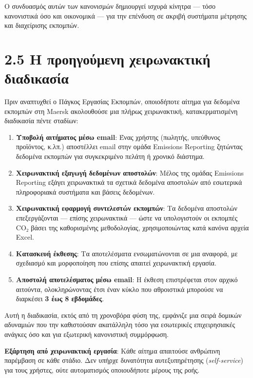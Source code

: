 \documentclass[11pt,a4paper,greek,twoside]{template-xe}
\providecommand{\tightlist}{\setlength{\itemsep}{0pt}\setlength{\parskip}{0pt}}
\begin{document}
Ο συνδυασμός αυτών των κανονισμών δημιουργεί ισχυρά κίνητρα --- τόσο
κανονιστικά όσο και οικονομικά --- για την επένδυση σε ακριβή συστήματα
μέτρησης και διαχείρισης εκπομπών.

\section{2.5 Η προηγούμενη χειρωνακτική
διαδικασία}\label{ux3b7-ux3c0ux3c1ux3bfux3b7ux3b3ux3bfux3cdux3bcux3b5ux3bdux3b7-ux3c7ux3b5ux3b9ux3c1ux3c9ux3bdux3b1ux3baux3c4ux3b9ux3baux3ae-ux3b4ux3b9ux3b1ux3b4ux3b9ux3baux3b1ux3c3ux3afux3b1}

Πριν αναπτυχθεί ο Πάγκος Εργασίας Εκπομπών, οποιοδήποτε αίτημα για
δεδομένα εκπομπών στη Maersk ακολουθούσε μια πλήρως χειρωνακτική,
κατακερματισμένη διαδικασία πέντε σταδίων:

\begin{enumerate}
\def\labelenumi{\arabic{enumi}.}
\tightlist
\item
  \textbf{Υποβολή αιτήματος μέσω email}: Ένας χρήστης (πωλητής,
  υπεύθυνος προϊόντος, κ.λπ.) αποστέλλει email στην ομάδα Emissions
  Reporting ζητώντας δεδομένα εκπομπών για συγκεκριμένο πελάτη ή χρονικό
  διάστημα.
\item
  \textbf{Χειρωνακτική εξαγωγή δεδομένων αποστολών}: Μέλος της ομάδας
  Emissions Reporting εξάγει χειρωνακτικά τα σχετικά δεδομένα αποστολών
  από εσωτερικά πληροφοριακά συστήματα και βάσεις δεδομένων.
\item
  \textbf{Χειρωνακτική εφαρμογή συντελεστών εκπομπών}: Τα δεδομένα
  αποστολών επεξεργάζονται --- επίσης χειρωνακτικά --- ώστε να
  υπολογιστούν οι εκπομπές CO₂ βάσει της καθορισμένης μεθοδολογίας,
  χρησιμοποιώντας κατά κανόνα αρχεία Excel.
\item
  \textbf{Κατασκευή έκθεσης}: Τα αποτελέσματα ενσωματώνονται σε μια
  αναφορά, με σχεδιασμό και μορφοποίηση που επίσης απαιτεί χειρωνακτική
  εργασία.
\item
  \textbf{Αποστολή αποτελέσματος μέσω email}: Η έκθεση επιστρέφεται στον
  αρχικό αιτούντα, ολοκληρώνοντας έτσι έναν κύκλο που αθροιστικά
  μπορούσε να διαρκέσει \textbf{3 έως 8 εβδομάδες}.
\end{enumerate}

Αυτή η διαδικασία, εκτός από τη χρονοβόρα φύση της, εμφάνιζε μια σειρά
δομικών αδυναμιών που την καθιστούσαν ακατάλληλη τόσο για εσωτερικές
επιχειρησιακές ανάγκες όσο και για εξωτερική κανονιστική συμμόρφωση.

\textbf{Εξάρτηση από χειρωνακτική εργασία}: Κάθε αίτημα απαιτούσε
ανθρώπινη παρέμβαση σε κάθε στάδιο. Δεν υπήρχε δυνατότητα
αυτεξυπηρέτησης (\emph{self-service}) για τους χρήστες, ούτε
αυτοματισμός οποιουδήποτε μέρους της ροής.
\end{document}
